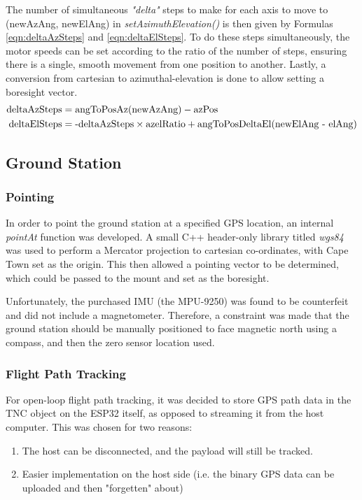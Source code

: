 \noindent The number of simultaneous \textit{"delta"} steps to make for each axis to move to (newAzAng, newElAng) in \textit{setAzimuthElevation()} is then given by Formulas \ref{eqn:deltaAzSteps} and \ref{eqn:deltaElSteps}. To do these steps simultaneously, the motor speeds can be set according to the ratio of the number of steps, ensuring there is a single, smooth movement from one position to another. Lastly, a conversion from cartesian to azimuthal-elevation is done to allow setting a boresight vector.
\begin{align}
    \textnormal{deltaAzSteps} &= \textnormal{angToPosAz(newAzAng)} - \textnormal{azPos} \label{eqn:deltaAzSteps} \\ 
    \textnormal{deltaElSteps} &= \textnormal{-deltaAzSteps} \times \textnormal{azelRatio} + \textnormal {angToPosDeltaEl(newElAng - elAng)}\label{eqn:deltaElSteps} 
\end{align}

\subsection{Ground Station}

\subsubsection{Pointing}
In order to point the ground station at a specified GPS location, an internal \textit{pointAt} function was developed. A small C++ header-only library titled \textit{wgs84} was used to perform a Mercator projection to cartesian co-ordinates, with Cape Town set as the origin. This then allowed a pointing vector to be determined, which could be passed to the mount and set as the boresight.

Unfortunately, the purchased IMU (the MPU-9250) was found to be counterfeit and did not include a magnetometer. Therefore, a constraint was made that the ground station should be manually positioned to face magnetic north using a compass, and then the zero sensor location used.

\subsubsection{Flight Path Tracking}
For open-loop flight path tracking, it was decided to store GPS path data in the TNC object on the ESP32 itself, as opposed to streaming it from the host computer. This was chosen for two reasons:
\begin{enumerate}
  \item The host can be disconnected, and the payload will still be tracked.
  \item Easier implementation on the host side (i.e. the binary GPS data can be uploaded and then "forgetten" about)
\end{enumerate}

